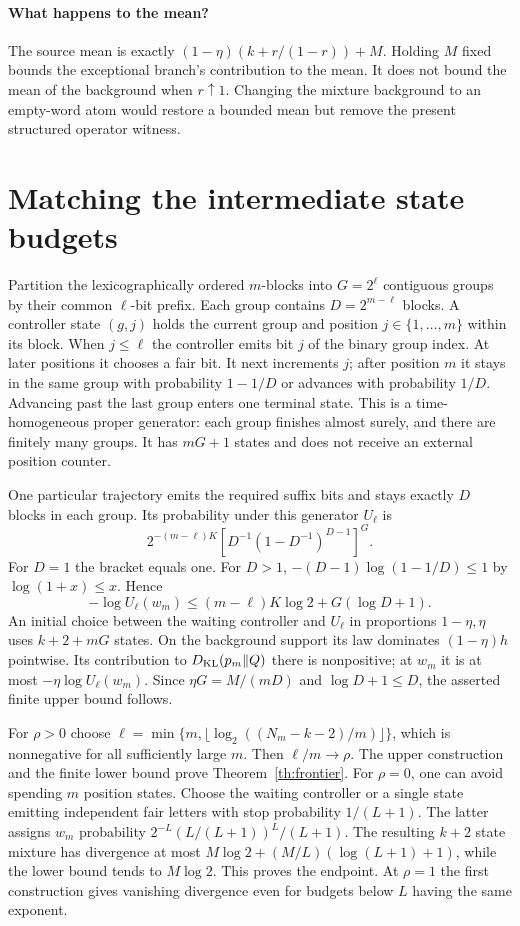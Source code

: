 \paragraph{What happens to the mean?}
The source mean is exactly \((1-\eta)(k+r/(1-r))+M\). Holding \(M\) fixed bounds the exceptional branch's contribution to the mean. It does not bound the mean of the background when \(r\uparrow1\). Changing the mixture background to an empty-word atom would restore a bounded mean but remove the present structured operator witness.

\section{Matching the intermediate state budgets}\label{app:upper}
Partition the lexicographically ordered $m$-blocks into $G=2^\ell$ contiguous groups by their common $\ell$-bit prefix. Each group contains $D=2^{m-\ell}$ blocks. A controller state $(g,j)$ holds the current group and position $j\in\{1,\ldots,m\}$ within its block. When $j\le\ell$ the controller emits bit $j$ of the binary group index. At later positions it chooses a fair bit. It next increments $j$; after position $m$ it stays in the same group with probability $1-1/D$ or advances with probability $1/D$. Advancing past the last group enters one terminal state. This is a time-homogeneous proper generator: each group finishes almost surely, and there are finitely many groups. It has $mG+1$ states and does not receive an external position counter.

One particular trajectory emits the required suffix bits and stays exactly $D$ blocks in each group. Its probability under this generator $U_\ell$ is
\[
 2^{-(m-\ell)K}\left[D^{-1}(1-D^{-1})^{D-1}\right]^G .
\]
For $D=1$ the bracket equals one. For $D>1$, $-(D-1)\log(1-1/D)\le1$ by $\log(1+x)\le x$. Hence
\[
 -\log U_\ell(w_m)\le (m-\ell)K\log 2 + G(\log D+1).
\]
An initial choice between the waiting controller and $U_\ell$ in proportions $1-\eta,\eta$ uses $k+2+mG$ states. On the background support its law dominates $(1-\eta)h$ pointwise. Its contribution to $D_{\mathrm{KL}}(p_m\Vert Q)$ there is nonpositive; at $w_m$ it is at most $-\eta\log U_\ell(w_m)$. Since $\eta G=M/(mD)$ and $\log D+1\le D$, the asserted finite upper bound follows.

For $\rho>0$ choose $\ell=\min\{m,\lfloor\log_2((N_m-k-2)/m)\rfloor\}$, which is nonnegative for all sufficiently large $m$. Then $\ell/m\to\rho$. The upper construction and the finite lower bound prove Theorem~\ref{th:frontier}. For $\rho=0$, one can avoid spending $m$ position states. Choose the waiting controller or a single state emitting independent fair letters with stop probability $1/(L+1)$. The latter assigns $w_m$ probability $2^{-L}(L/(L+1))^L/(L+1)$. The resulting $k+2$ state mixture has divergence at most $M\log2+(M/L)(\log(L+1)+1)$, while the lower bound tends to $M\log2$. This proves the endpoint. At $\rho=1$ the first construction gives vanishing divergence even for budgets below $L$ having the same exponent.

